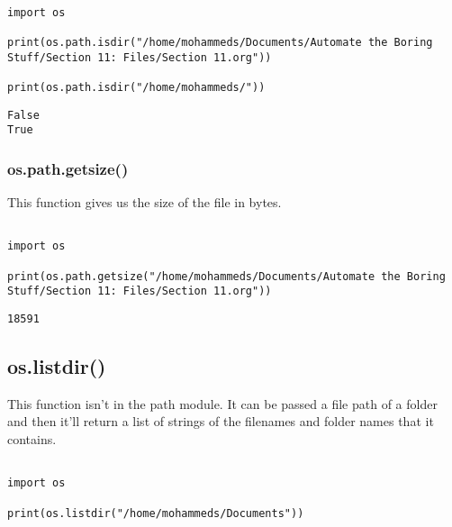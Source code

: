 \documentclass[11pt]{article}
\begin{document}
\begin{verbatim}

import os

print(os.path.isdir("/home/mohammeds/Documents/Automate the Boring Stuff/Section 11: Files/Section 11.org"))

print(os.path.isdir("/home/mohammeds/"))

\end{verbatim}

\begin{verbatim}
False
True
\end{verbatim}

\subsubsection{os.path.getsize()}
\label{sec:orgf150393}

This function gives us the size of the file in bytes.

\begin{verbatim}

import os

print(os.path.getsize("/home/mohammeds/Documents/Automate the Boring Stuff/Section 11: Files/Section 11.org"))

\end{verbatim}

\begin{verbatim}
18591
\end{verbatim}

\subsection{os.listdir()}
\label{sec:org94bb7c3}

This function isn't in the path module. It can be passed a file path of a folder and then it'll return a list of strings of the filenames and folder names that it contains.

\begin{verbatim}

import os

print(os.listdir("/home/mohammeds/Documents"))

\end{verbatim}
\end{document}
